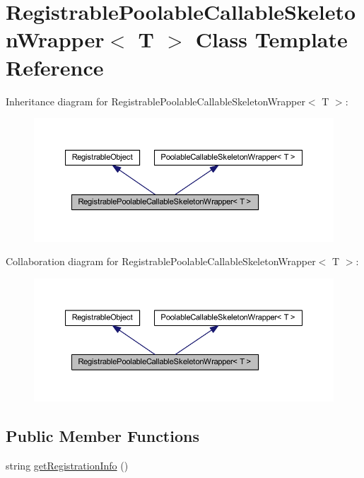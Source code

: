 \hypertarget{class_registrable_poolable_callable_skeleton_wrapper}{
\section{RegistrablePoolableCallableSkeletonWrapper$<$ T $>$ Class Template Reference}
\label{class_registrable_poolable_callable_skeleton_wrapper}
}


Inheritance diagram for RegistrablePoolableCallableSkeletonWrapper$<$ T $>$:\nopagebreak
\begin{figure}[H]
\begin{center}
\leavevmode
\includegraphics[width=379pt]{class_registrable_poolable_callable_skeleton_wrapper__inherit__graph}
\end{center}
\end{figure}


Collaboration diagram for RegistrablePoolableCallableSkeletonWrapper$<$ T $>$:\nopagebreak
\begin{figure}[H]
\begin{center}
\leavevmode
\includegraphics[width=379pt]{class_registrable_poolable_callable_skeleton_wrapper__coll__graph}
\end{center}
\end{figure}
\subsection*{Public Member Functions}
\begin{DoxyCompactItemize}
\item 
string \hyperlink{class_registrable_poolable_callable_skeleton_wrapper_a96e607728aed791c91ea7f209e4ec747}{getRegistrationInfo} ()
\end{DoxyCompactItemize}
